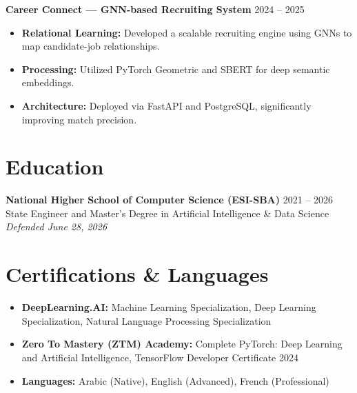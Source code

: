 \documentclass[a4paper,10pt]{article}
\begin{document}
\vspace{6pt}
\noindent\textbf{Career Connect --- GNN-based Recruiting System} \hfill 2024 -- 2025 \\
\begin{itemize}
    \item \textbf{Relational Learning:} Developed a scalable recruiting engine using GNNs to map candidate-job relationships.
    \item \textbf{Processing:} Utilized PyTorch Geometric and SBERT for deep semantic embeddings.
    \item \textbf{Architecture:} Deployed via FastAPI and PostgreSQL, significantly improving match precision.
\end{itemize}

\section{Education}
\textbf{National Higher School of Computer Science (ESI-SBA)} \hfill 2021 -- 2026 \\
State Engineer and Master's Degree in Artificial Intelligence \& Data Science \\
\textit{Defended June 28, 2026}

\section{Certifications \& Languages}
\begin{itemize}[label=--]
    \item \textbf{DeepLearning.AI:} Machine Learning Specialization, Deep Learning Specialization, Natural Language Processing Specialization
    \item \textbf{Zero To Mastery (ZTM) Academy:} Complete PyTorch: Deep Learning and Artificial Intelligence, TensorFlow Developer Certificate 2024
    \item \textbf{Languages:} Arabic (Native), English (Advanced), French (Professional)
\end{itemize}
\end{document}
